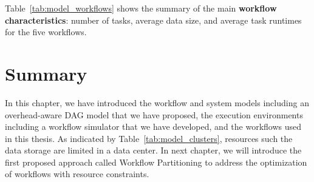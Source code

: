 Table~\ref{tab:model_workflows} shows the summary of the main \textbf{workflow characteristics}: number of tasks, average data size, and average task runtimes for the five workflows. 

\section{Summary}

In this chapter, we have introduced the workflow and system models including an overhead-aware DAG model that we have proposed, the execution environments including a workflow simulator that we have developed, and the workflows used in this thesis. As indicated by Table~\ref{tab:model_clusters}, resources such the data storage are limited in a data center. In next chapter, we will introduce the first proposed approach called Workflow Partitioning to address the optimization of workflows with resource constraints. 

